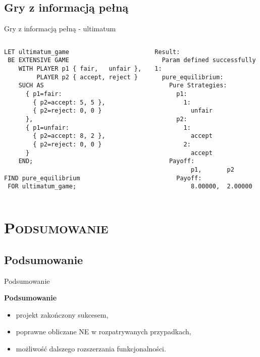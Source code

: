 \documentclass[xcolor=x11names,compress]{beamer}
\renewcommand{\(}{\begin{columns}}
\renewcommand{\)}{\end{columns}}
\newcommand{\<}[1]{\begin{column}{#1}}
\renewcommand{\>}{\end{column}}
\begin{document}
\subsection{Gry z informacją pełną}
\begin{frame}[fragile]{Gry z informacją pełną - ultimatum}
\begin{columns}[c]
\begin{column}{.5\textwidth}
\begin{lstlisting}
LET ultimatum_game
 BE EXTENSIVE GAME
    WITH PLAYER p1 { fair,   unfair },
         PLAYER p2 { accept, reject }
    SUCH AS
      { p1=fair:
        { p2=accept: 5, 5 },
        { p2=reject: 0, 0 }
      },
      { p1=unfair:
        { p2=accept: 8, 2 },
        { p2=reject: 0, 0 }
      }
    END;

FIND pure_equilibrium
 FOR ultimatum_game;
\end{lstlisting}
\end{column}
\hspace{5pt}\vrule\hspace{5pt}
\begin{column}{.5\textwidth}
\begin{lstlisting}
Result:
  Param defined successfully
1:
  pure_equilibrium:
    Pure Strategies:
      p1:
        1:
          unfair
      p2:
        1:
          accept
        2:
          accept
    Payoff:
          p1,       p2
      Payoff:
          8.00000,  2.00000
\end{lstlisting}
\end{column}
\end{columns}
\end{frame}


\section{\scshape Podsumowanie}

\subsection{Podsumowanie}
\begin{frame}{Podsumowanie}
\begin{center}
\textbf{Podsumowanie}
\begin{itemize}
\item projekt zakończony sukcesem,
\item poprawne obliczane NE w rozpatrywanych przypadkach,
\item możliwość dalszego rozszerzania funkcjonalności.
\end{itemize}
\end{center}
\end{frame}
\end{document}
